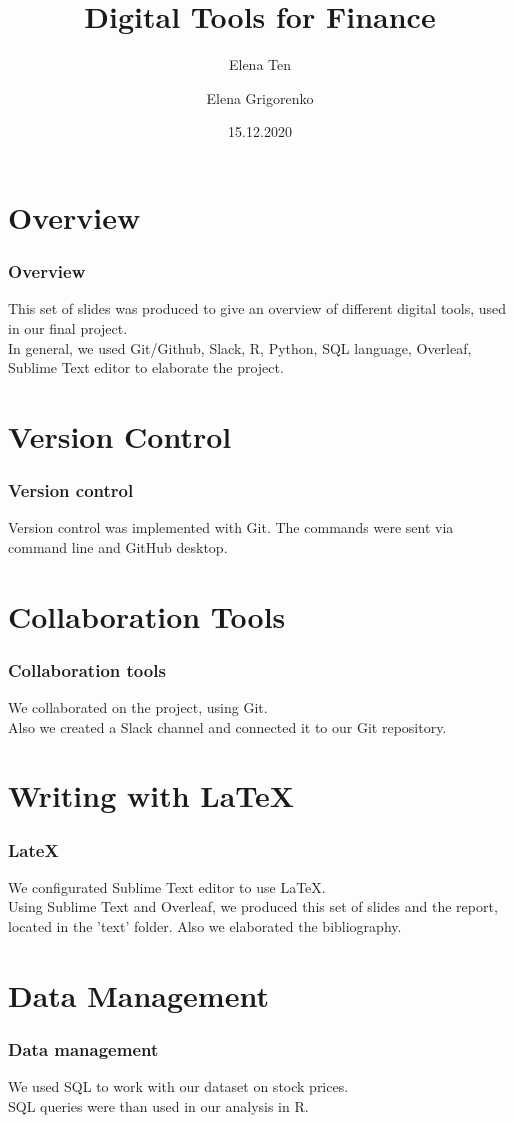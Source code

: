 \documentclass {beamer}
\title{Digital Tools for Finance}
\author [Ten, Grigorenko] {Elena Ten \and Elena Grigorenko}
\institute [UZH] {University of Zurich}
\date {15.12.2020}
\begin{document}
\frame{\titlepage}

\section{Overview}
\begin{frame}
\frametitle{Overview}
This set of slides was produced to give an overview of different digital tools, used in our final project.\\
In general, we used Git/Github, Slack, R, Python, SQL language, Overleaf, Sublime Text editor to elaborate the project. 

\end{frame}



\section{Version Control}
\begin{frame}
\frametitle{Version control}
Version control was implemented with Git. The commands were sent via command line and GitHub desktop.

\end{frame}


\section{Collaboration Tools}
\begin{frame}
\frametitle{Collaboration tools}
We collaborated on the project, using Git.\\
Also we created a Slack channel and connected it to our Git repository.

\end{frame}


\section{Writing with LaTeX}
\begin{frame}
\frametitle{LateX}
We configurated Sublime Text editor to use LaTeX.\\
Using Sublime Text and Overleaf, we produced this set of slides and the report, located in the 'text' folder.
Also we elaborated the bibliography.


\end{frame}

\section{Data Management}
\begin{frame}
\frametitle{Data management}
We used SQL to work with our dataset on stock prices.\\
SQL queries were than used in our analysis in R.

\end{frame}
\end{document}

